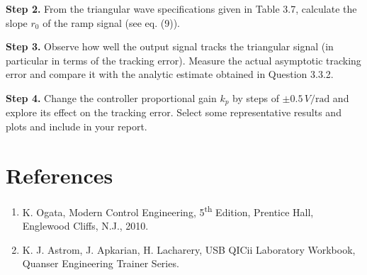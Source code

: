 \documentclass{article}
\begin{document}
\textbf{Step 2.} From the triangular wave specifications given in Table 3.7, calculate the slope \(r_0\) of the ramp signal (see eq. (9)).

\textbf{Step 3.} Observe how well the output signal tracks the triangular signal (in particular in terms of the tracking error). Measure the actual asymptotic tracking error and compare it with the analytic estimate obtained in Question 3.3.2.

\textbf{Step 4.} Change the controller proportional gain \(k_p\) by steps of \(\pm 0.5 \, V/\text{rad}\) and explore its effect on the tracking error. Select some representative results and plots and include in your report.

\section{References}
\begin{enumerate}
    \item K. Ogata, Modern Control Engineering, 5\textsuperscript{th} Edition, Prentice Hall, Englewood Cliffs, N.J., 2010.
    \item K. J. Astrom, J. Apkarian, H. Lacharery, USB QICii Laboratory Workbook, Quanser Engineering Trainer Series.
\end{enumerate}
\end{document}

